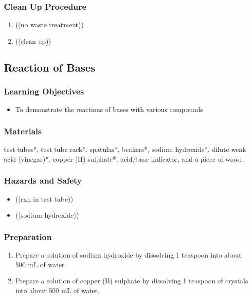 \subsubsection*{Clean Up Procedure}
\begin{enumerate}
\item{((no waste treatment))}
\item{((clean up))}
\end{enumerate}



\subsection{Reaction of Bases}

\subsubsection*{Learning Objectives}
\begin{itemize}
\item{To demonstrate the reactions of bases with various compounds}
\end{itemize}

\subsubsection*{Materials}
test tubes*, test tube rack*, spatulas*, beakers*, sodium hydroxide*, dilute weak acid (vinegar)*, copper (II) sulphate*, acid/base indicator, and a piece of wood.

\subsubsection*{Hazards and Safety}
\begin{itemize}
\item{((rxn in test tube))}
\item{((sodium hydroxide))}
\end{itemize}

\subsubsection*{Preparation}
\begin{enumerate}
\item{Prepare a solution of sodium hydroxide by dissolving 1 teaspoon into about 500 mL of water}
\item{ Prepare a solution of copper (II) sulphate by dissolving 1 teaspoon of crystals into about 500 mL of water.}
\end{enumerate}

